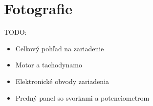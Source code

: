 \documentclass[a4paper, 10pt, ]{article}
\begin{document}
\section{Fotografie}

TODO:

\begin{itemize}
    \item Celkový pohľad na zariadenie
    \item Motor a tachodynamo
    \item Elektronické obvody zariadenia
    \item Predný panel so svorkami a potenciometrom
\end{itemize}







































































\end{document}

